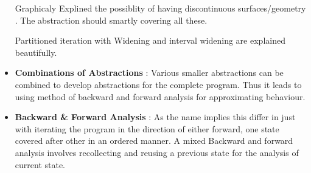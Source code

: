 \begin{itemize}
{	Graphicaly Explined the possiblity of having discontinuous surfaces/geometry . The abstraction should smartly covering all these. 

	Partitioned iteration with Widening and interval widening are explained beautifully. 
	}
	\item{\textbf{Combinations of Abstractions} : 
	Various smaller abstractions can be combined to develop abstractions for the complete program. Thus it leads to using method of backward and forward analysis for approximating behaviour.
	}
	\item{\textbf{Backward \& Forward Analysis} :
	As the name implies this differ in just with iterating the program in the direction of either forward, one state covered after other in an ordered manner. A mixed Backward and forward analysis involves recollecting and reusing a previous state	for the analysis of current state. 
	}
\end{itemize}